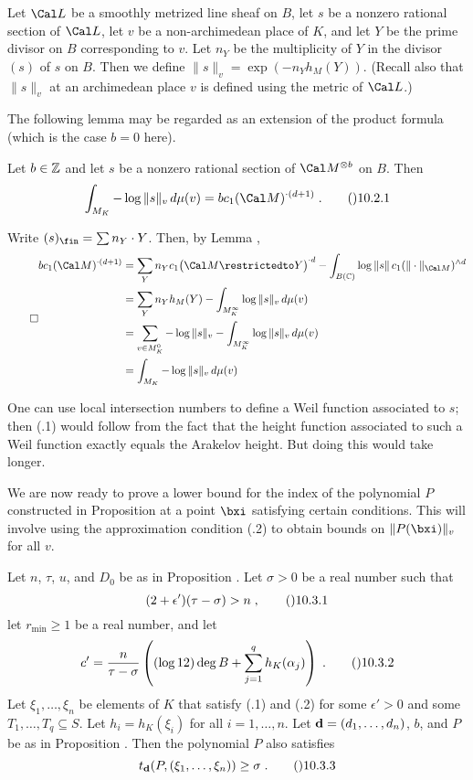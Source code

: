   Let $\Cal L$ be a smoothly metrized line sheaf on $B$, let $s$
be a nonzero rational section of $\Cal L$, let $v$ be a non-archimedean
place of $K$, and let $Y$ be the prime divisor on $B$ corresponding to $v$.
Let $n_Y$ be the multiplicity of $Y$ in the divisor $(s)$ of $s$ on $B$.
Then we define $\|s\|_v=\exp(-n_Y h_M(Y))$.  (Recall also that $\|s\|_v$
at an archimedean place $v$ is defined using the metric of $\Cal L$.)
\endit

The following lemma may be regarded as an extension of the product formula
(which is the case $b=0$ here).

  Let $b\in\Bbb Z$ and let $s$ be a nonzero rational section
of $\Cal M^{\otimes b}$ on $B$.  Then
$$\int_{M_K} -\log\|s\|_v \,d\mu(v) = b c_1(\Cal M)^{\cdot(d+1)}\;.
  \tag\010.2.1$$
\endit

  Write $(s)_\fin=\sum n_Y\cdot Y$.  Then, by Lemma ,
$$\qed\split b c_1(\Cal M)^{\cdot(d+1)}
  &= \sum_Y n_Yc_1\bigl(\Cal M\restrictedto Y\bigr)^{\cdot d}
  - \int_{B(\Bbb C)} \log\|s\| \,c_1(\|\cdot\|_{\Cal M})^{\wedge d} \\
  &= \sum_Y n_Y h_M(Y) - \int_{M_K^\infty} \log\|s\|_v \,d\mu(v) \\
  &= \sum_{v\in M_K^0} -\log\|s\|_v
    - \int_{M_K^\infty} \log\|s\|_v \,d\mu(v) \\
  &= \int_{M_K} -\log\|s\|_v \,d\mu(v)\endsplit$$
\enddemo

\comment
{}  One can use local intersection numbers to define a Weil function
associated to $s$; then (.1) would follow from the fact that the
height function associated to such a Weil function exactly equals the Arakelov
height.  But doing this would take longer.
\endit
\endcomment

We are now ready to prove a lower bound for the index of the polynomial $P$
constructed in Proposition  at a point $\bxi$ satisfying certain
conditions.  This will involve using the approximation condition (.2)
to obtain bounds on $\|P(\bxi)\|_v$ for all $v$.

 Let $n$, $\tau$, $u$, and $D_0$ be as in Proposition .
Let $\sigma>0$ be a real number such that
$$(2+\epsilon')(\tau-\sigma) > n\;,\tag\010.3.1$$
let $r_{\min}\ge1$ be a real number, and let
$$c'
  = \frac n{\tau-\sigma}\left((\log 12)\deg B
    + \sum_{j=1}^q h_K(\alpha_j)\right)\;.\tag\010.3.2$$
Let $\xi_1,\dots,\xi_n$
be elements of $K$ that satisfy (.1) and (.2) for some $\epsilon'>0$
and some $T_1,\dots,T_q\subseteq S$.  Let $h_i=h_K(\xi_i)$
for all $i=1,\dots,n$.
Let $\bold d=(d_1,\dots,d_n)$, $b$, and $P$ be as in Proposition .
Then the polynomial $P$ also satisfies
$$t_{\bold d}(P,(\xi_1,\dots,\xi_n)) \ge \sigma\;.\tag\010.3.3$$
\endit

